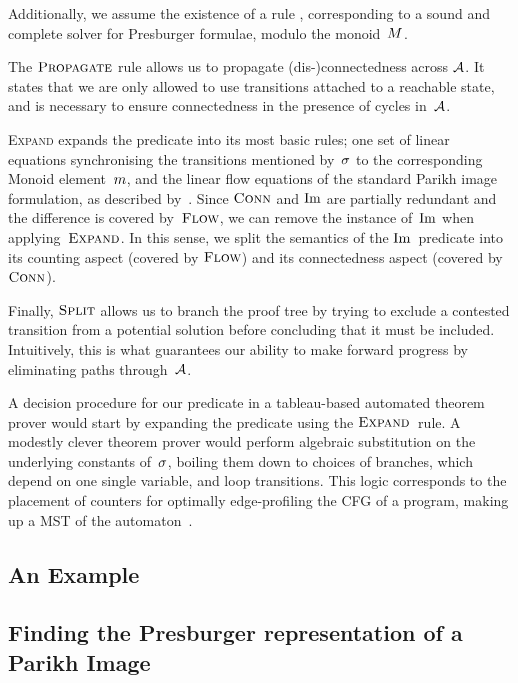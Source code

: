 \documentclass[acmsmall,review,anonymous]{acmart}\settopmatter{printfolios=true,printccs=false,printacmref=true}
\theoremstyle{definition}
\newif\ifoutline
\newcommand{\contents}[1]{\ifoutline{\color{blue}
    \begin{itemize}
    #1
    \end{itemize}
  }\fi}
\begin{document}
Additionally, we assume the existence of a rule \PresburgerClose{},
corresponding to a sound and complete solver for Presburger formulae, modulo the
monoid~$M$.

The $\textsc{Propagate}{}$ rule allows us to propagate (dis-)connectedness across
$\mathcal{A}$. It states that we are only allowed to use transitions attached to
a reachable state, and is necessary to ensure connectedness in the presence of
cycles in~$\mathcal{A}$.

\textsc{Expand} expands the predicate into its most basic rules; one set of
linear equations synchronising the transitions mentioned by~$\operatorname{\sigma}$ to the
corresponding Monoid element~$m$, and the linear flow equations of
the standard Parikh image formulation, as described by~\FlowEq. Since
$\operatorname{\textsc{Conn}}$ and $\operatorname{Im}$ are partially redundant and the difference is covered
by~$\textsc{Flow}$, we can remove the instance of~$\operatorname{Im}$ when applying~$\textsc{Expand}$. In
this sense, we split the semantics of the $\operatorname{Im}$~predicate into its counting
aspect (covered by $\textsc{Flow}$) and its connectedness aspect (covered by
$\operatorname{\textsc{Conn}}$).

Finally, $\textsc{Split}{}$ allows us to branch the proof tree by trying to exclude a
contested transition from a potential solution before concluding that it must be
included. Intuitively, this is what guarantees our ability to make forward
progress by eliminating paths through~$\mathcal{A}$.

A decision procedure for our predicate in a tableau-based automated theorem
prover would start by expanding the predicate using the $\textsc{Expand}{}$~rule. A
modestly clever theorem prover would perform algebraic substitution on the
underlying constants of~$\operatorname{\sigma}$, boiling them down to choices of branches,
which depend on one single variable, and loop transitions. This logic
corresponds to the placement of counters for optimally edge-profiling the CFG of
a program, making up a MST of the automaton~\cite{path-profiling}.

\subsection{An Example}

\subsection{Finding the Presburger representation of a Parikh Image}
\contents{
  \item lazy qe
}
\end{document}
